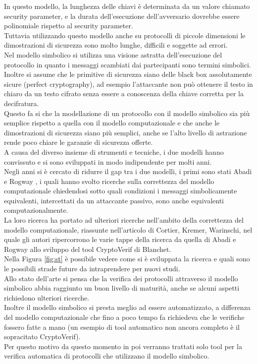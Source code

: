 In questo modello, la lunghezza delle chiavi è determinata da un valore chiamato security parameter, e la durata dell'esecuzione dell'avversario dovrebbe essere polinomiale rispetto al security parameter.\\
Tuttavia utilizzando questo modello anche su protocolli di piccole dimensioni le dimostrazioni di sicurezza sono molto lunghe, difficili e soggette ad errori.\\
Nel modello simbolico si utilizza una visione astratta dell'esecuzione del protocollo in quanto i messaggi scambiati dai partecipanti sono termini simbolici.\\
Inoltre si assume che le primitive di sicurezza siano delle black box assolutamente sicure (perfect cryptography), ad esempio l'attaccante non può ottenere il testo in chiaro da un testo cifrato senza essere a conoscenza della chiave corretta per la decifratura.\\
Questo fa si che la modellazione di un protocollo con il modello simbolico sia più semplice rispetto a quella con il modello computazionale e che anche le dimostrazioni di sicurezza siano più semplici, anche se l'alto livello di astrazione rende poco chiare le garanzie di sicurezza offerte.\\
A causa del diverso insieme di strumenti e tecniche, i due modelli hanno convissuto e si sono sviluppati in modo indipendente per molti anni.\\
Negli anni si è cercato di ridurre il gap tra i due modelli, i primi sono stati Abadi e Rogway \cite{AR00}, i quali hanno svolto ricerche sulla correttezza del modello computazionale chiedendosi sotto quali condizioni i messaggi simbolicamente equivalenti, intercettati da un attaccante passivo, sono anche equivalenti computazionalmente.\\
La loro ricerca ha portato ad ulteriori ricerche nell'ambito della correttezza del modello computazionale, riassunte nell'articolo di Cortier, Kremer, Warinschi\cite{CSW11}, nel quale gli autori ripercorrono le varie tappe della ricerca da quella di Abadi e Rogway allo sviluppo del tool CryptoVerif di Blanchet.\\
Nella Figura \ref*{fig:st} è possibile vedere come si è sviluppata la ricerca e quali sono le possibili strade future da intraprendere per nuovi studi.\\
Allo stato dell'arte si pensa che la verifica dei protocolli attraverso il modello simbolico abbia raggiunto un buon livello di maturità, anche se alcuni aspetti richiedono ulteriori ricerche.\\
Inoltre il modello simbolico si presta meglio ad essere automatizzato, a differenza del modello computazionale che fino a poco tempo fa richiedeva che le verifiche fossero fatte a mano (un esempio di tool automatico non ancora completo è il sopracitato CryptoVerif).\\ 
Per questo motivo da questo momento in poi verranno trattati solo tool per la verifica automatica di protocolli che utilizzano il modello simbolico.\\


